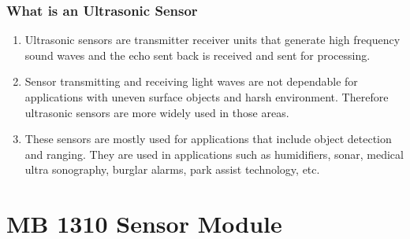 \documentclass[table,10pt,red]{beamer}	%
\begin{document}
\begin{frame}
	\frametitle{What is an Ultrasonic Sensor}
 		\begin{enumerate}[$\checkmark$]
 				\item <+-|alert@+> Ultrasonic sensors are transmitter receiver units that generate high frequency sound waves and the echo sent back is received and sent for processing. 
 				
 				\item <+-|alert@+> Sensor transmitting and receiving light waves are not dependable for applications with uneven surface objects and harsh environment. Therefore ultrasonic sensors are more widely used in those areas.
 				
 				\item <+-|alert@+> These sensors are mostly used for applications that include object detection and ranging. They are used in applications such as humidifiers, sonar, medical ultra sonography, burglar alarms, park assist technology, etc.
 				
 		\end{enumerate}
\end{frame}

\section{MB 1310 Sensor Module}
\end{document}
